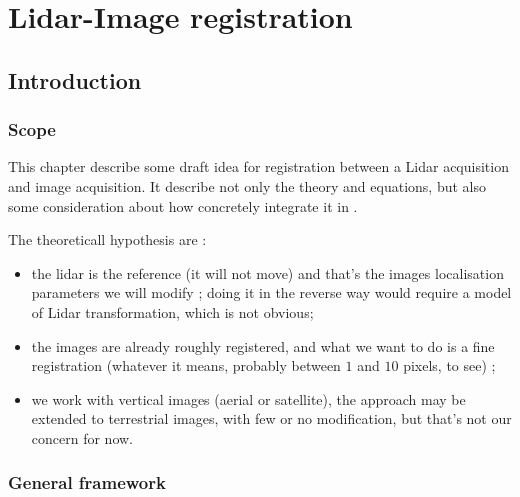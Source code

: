 \chapter{Lidar-Image registration}
\label{Chap:LidImRed}



\section{Introduction}

\subsection{Scope}

This chapter describe some draft idea for registration  between a Lidar
acquisition and image acquisition.  It describe not only the theory and equations,
but also some consideration about how concretely integrate it in \PPP.

The theoreticall hypothesis are :

\begin{itemize}
   \item  the lidar is the reference (it will not move) and that's the images localisation parameters
          we will  modify ; doing it in the reverse way would require
          a model of Lidar transformation, which is not obvious;

   \item  the images are already roughly registered, and what we want to do is a fine 
          registration (whatever it means, probably between $1$ and $10$ pixels, to see) ;
 
   \item  we work with vertical images (aerial or satellite),  the approach
          may be extended to terrestrial images, with few or no modification, but that's not our concern for now.
\end{itemize}


\subsection{General framework}

